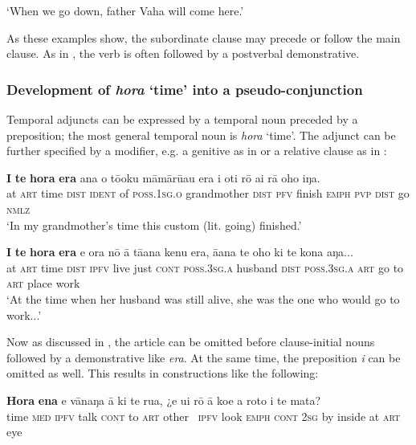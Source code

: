 \glt
‘When we go down, father Vaha will come here.’ \textstyleExampleref{[R229.187]} 
\z

As these examples show, the subordinate clause may precede or follow the main clause. As in , the verb is often followed by a postverbal demonstrative.

\subsubsection[Development of hora ‘time’ into a pseudo{}-conjunction]{Development of \textit{hora} ‘time’ into a pseudo-conjunction}\label{sec:11.6.2.3}
Temporal adjuncts can be expressed by a temporal noun preceded by a preposition; the most general temporal noun is \textit{hora} ‘time’. The adjunct can be further specified by a modifier, e.g. a genitive as in  or a relative clause as in :

\ea\label{ex:11.230}
\gll \textbf{{\ꞌ}I} \textbf{te} \textbf{hora} \textbf{era} {\ꞌ}ana o tō{\ꞌ}oku māmārū{\ꞌ}au era i oti rō ai  rā oho iŋa.\\
at \textsc{art} time \textsc{dist} \textsc{ident} of \textsc{poss.1sg.o} grandmother \textsc{dist} \textsc{pfv} finish \textsc{emph} \textsc{pvp}  \textsc{dist} go \textsc{nmlz}\\

\glt 
‘In my grandmother’s time this custom (lit. going) finished.’ \textstyleExampleref{[R648.137]} 
\z

\ea\label{ex:11.231}
\gll \textbf{{\ꞌ}I} \textbf{te} \textbf{hora} \textbf{era} e ora nō {\ꞌ}ā tā{\ꞌ}ana kenu era, {\ꞌ}ā{\ꞌ}ana te oho  ki te kona aŋa...\\
at \textsc{art} time \textsc{dist} \textsc{ipfv} live just \textsc{cont} \textsc{poss.3sg.a} husband \textsc{dist} \textsc{poss.3sg.a} \textsc{art} go  to \textsc{art} place work\\

\glt
‘At the time when her husband was still alive, she was the one who would go to work...’ \textstyleExampleref{[R349.005]} 
\z

Now as discussed in , the article can be omitted before clause-initial nouns followed by a demonstrative like \textit{era}. At the same time, the preposition \textit{{\ꞌ}i} can be omitted as well. This results in constructions like the following:

\ea\label{ex:11.232}
\gll \textbf{Hora} \textbf{ena} e vānaŋa {\ꞌ}ā ki te rua, ¿e u{\ꞌ}i rō {\ꞌ}ā koe  a roto i te mata?\\
time \textsc{med} \textsc{ipfv} talk \textsc{cont} to \textsc{art} other ~\textsc{ipfv} look \textsc{emph} \textsc{cont} \textsc{2sg}  by inside at \textsc{art} eye\\

